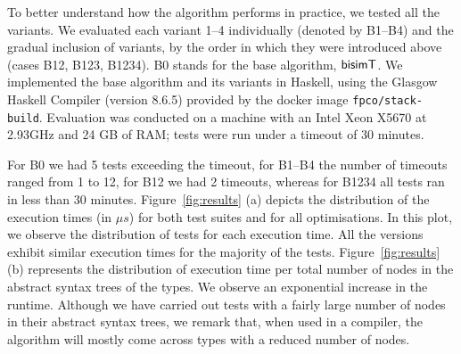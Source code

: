 To better understand how the algorithm performs in practice, we tested
all the variants. We evaluated each variant 1--4 individually (denoted
by B1--B4) and the gradual inclusion of variants, by the
order in which they were introduced above (cases B12, B123, B1234).
B0 stands for the base algorithm, $\mathsf{bisimT}$.
%
  We implemented the base algorithm and its
  variants %
  in Haskell, using the Glasgow Haskell Compiler (version 8.6.5)
  provided by the docker image \texttt{fpco/stack-build}. %
  Evaluation was conducted on a machine with an Intel Xeon X5670 at
  2.93GHz and 24 GB of RAM; tests were run under a timeout of 30
  minutes.

For B0 we had 5 tests exceeding the timeout, for B1--B4 the number of timeouts
ranged from 1 to 12, for B12 we had 2 timeouts, whereas for B1234 all tests
ran in less than 30 minutes.
%
%
%
Figure~\ref{fig:results} (a) depicts the distribution of the execution
times (in $\mu s$) for both test suites and for all optimisations.  In
this plot, we observe the distribution of tests for each execution
time.  All the versions exhibit similar execution times for the
majority of the tests.   
%
Figure~\ref{fig:results} (b) represents the distribution of execution
time per total number of nodes in the abstract syntax trees of the
types. We observe an exponential increase in the runtime.
%
Although we have carried out tests with a
fairly large number of nodes in their abstract syntax trees, we remark
that, when used in a compiler, the algorithm will mostly come across
types with a reduced number of nodes.


